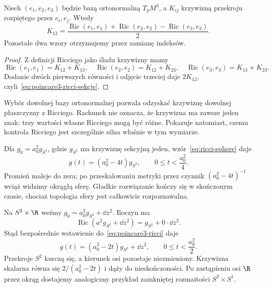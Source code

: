 \begin{stwierdzenie}
\label{prop:poincare3-ricci-sekcje}
Niech $(e_1,e_2,e_3)$ będzie bazą ortonormalną
$T_pM^3$, a $K_{ij}$ krzywizną przekroju rozpiętego
przez $e_i,e_j$. Wtedy
\begin{equation}\label{eq:poincare3-ricci-sekcje}
 K_{12}=\frac{\operatorname{Ric}(e_1,e_1)
              +\operatorname{Ric}(e_2,e_2)
              -\operatorname{Ric}(e_3,e_3)}{2}.
\end{equation}
Pozostałe dwa wzory otrzymujemy przez zamianę indeksów.
\end{stwierdzenie}
\begin{proof}
Z definicji Ricciego jako śladu krzywizny mamy
\[
 \operatorname{Ric}(e_1,e_1)=K_{12}+K_{13},\quad
 \operatorname{Ric}(e_2,e_2)=K_{12}+K_{23},\quad
 \operatorname{Ric}(e_3,e_3)=K_{13}+K_{23}.
\]
Dodanie dwóch pierwszych równości i odjęcie trzeciej
daje $2K_{12}$, czyli~\eqref{eq:poincare3-ricci-sekcje}.
\end{proof}

Wybór dowolnej bazy ortonormalnej pozwala odzyskać
krzywiznę dowolnej płaszczyzny z Ricciego. Rachunek
nie oznacza, że krzywizna ma zawsze jeden znak:
trzy wartości własne Ricciego mogą być różne.
Pokazuje natomiast, czemu kontrola Ricciego jest
szczególnie silna właśnie w tym wymiarze.

\begin{przyklad}
\label{prz:poincare3-kurczaca-sfera}
Dla $g_0=a_0^2g_{S^3}$, gdzie $g_{S^3}$ ma
krzywiznę sekcyjną jeden, wzór~\eqref{eq:ricci-sphere}
daje
\[
 g(t)=(a_0^2-4t)g_{S^3},\qquad
 0\leq t<\frac{a_0^2}{4}.
\]
Promień maleje do zera; po przeskalowaniu metryki
przez czynnik $(a_0^2-4t)^{-1}$ wciąż widzimy
okrągłą sferę. Gładkie rozwiązanie kończy się
w skończonym czasie, chociaż topologia sfery jest
całkowicie rozpoznawalna.
\end{przyklad}

\begin{przyklad}
\label{prz:poincare3-walec}
Na $S^2\times\R$ weźmy
$g_0=a_0^2g_{S^2}+\dd z^2$. Iloczyn ma
\[
 \operatorname{Ric}(a^2g_{S^2}+\dd z^2)
 =g_{S^2}+0\cdot\dd z^2.
\]
Stąd bezpośrednie wstawienie do~\eqref{eq:poincare3-ricci}
daje
\begin{equation}\label{eq:poincare3-walec}
 g(t)=(a_0^2-2t)g_{S^2}+\dd z^2,
 \qquad 0\leq t<\frac{a_0^2}{2}.
\end{equation}
Przekroje $S^2$ kurczą się, a kierunek osi pozostaje
niezmieniony. Krzywizna skalarna równa się
$2/(a_0^2-2t)$ i dąży do nieskończoności.
Po zastąpieniu osi $\R$ przez okrąg dostajemy
analogiczny przykład zamkniętej rozmaitości
$S^2\times S^1$.
\end{przyklad}

